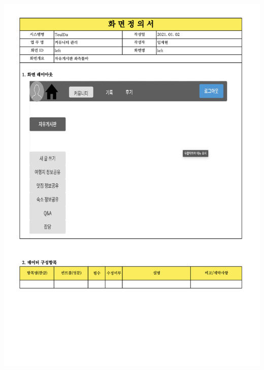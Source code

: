 {{{{{{{{{{{{{{{{{{{{{{{{{{{{{{{{{{{{{{{{{{\includegraphics[width=20cm]{./Figure/Analysis/Display/community/community_01.pdf} \\
}}}}}}}}}}}}}}}}}}}}}}}}}}}}}}}}}}}}}}}}}}
